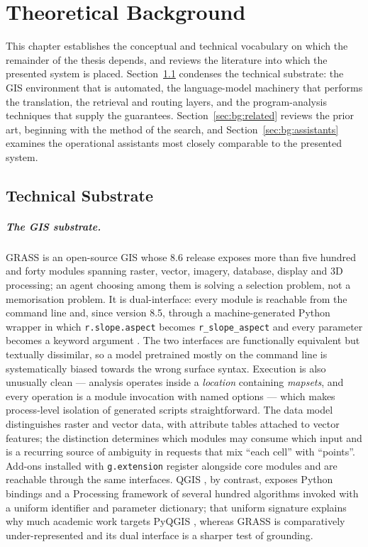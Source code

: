 \chapter{Theoretical Background}
\label{ch:background}

This chapter establishes the conceptual and technical vocabulary on which the
remainder of the thesis depends, and reviews the literature into which the
presented system is placed. Section~\ref{sec:bg:substrate} condenses the
technical substrate: the GIS environment that is automated, the language-model
machinery that performs the translation, the retrieval and routing layers, and
the program-analysis techniques that supply the guarantees.
Section~\ref{sec:bg:related} reviews the prior art, beginning with the method
of the search, and Section~\ref{sec:bg:assistants} examines the operational
assistants most closely comparable to the presented system.

\section{Technical Substrate}
\label{sec:bg:substrate}

\paragraph{The GIS substrate.} GRASS \cite{neteler2012grass} is an open-source
GIS whose 8.6 release exposes more than five hundred and forty modules spanning
raster, vector, imagery, database, display and 3D processing; an agent choosing
among them is solving a selection problem, not a memorisation problem. It is
dual-interface: every module is reachable from the command line and, since
version 8.5, through a machine-generated Python wrapper in which
\texttt{r.slope.aspect} becomes \texttt{r\_slope\_aspect} and every parameter
becomes a keyword argument \cite{grass_tools}. The two interfaces are
functionally equivalent but textually dissimilar, so a model pretrained mostly
on the command line is systematically biased towards the wrong surface syntax.
Execution is also unusually clean --- analysis operates inside a
\emph{location} containing \emph{mapsets}, and every operation is a module
invocation with named options --- which makes process-level isolation of
generated scripts straightforward. The data model distinguishes raster and
vector data, with attribute tables attached to vector features; the distinction
determines which modules may consume which input and is a recurring source of
ambiguity in requests that mix ``each cell'' with ``points''. Add-ons installed
with \texttt{g.extension} register alongside core modules and are reachable
through the same interfaces. QGIS \cite{qgissoftware}, by contrast, exposes
Python bindings \cite{pyqgis} and a Processing framework of several hundred
algorithms invoked with a uniform identifier and parameter dictionary; that
uniform signature explains why much academic work targets PyQGIS
\cite{mansourian2024chatgeoai}, whereas GRASS is comparatively
under-represented and its dual interface is a sharper test of grounding.

